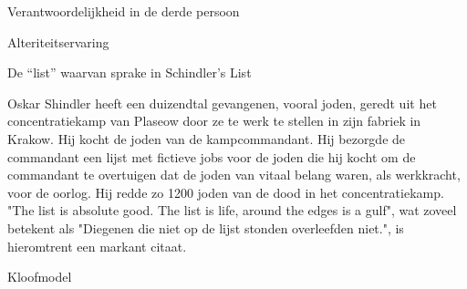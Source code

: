 \documentclass[main.tex]{subfiles}
\begin{document}
\begin{examenvraag}
    \begin{vraag}
        Verantwoordelijkheid in de derde persoon
    \end{vraag}

    \begin{antwoord}

    \end{antwoord}
\end{examenvraag}


\begin{examenvraag}
    \begin{vraag}
        Alteriteitservaring
    \end{vraag}

    \begin{antwoord}

    \end{antwoord}
\end{examenvraag}


\begin{examenvraag}
    \begin{vraag}
        De “list” waarvan sprake in Schindler’s List
    \end{vraag}

    \begin{antwoord}
        Oskar Shindler heeft een duizendtal gevangenen, vooral joden, geredt uit het concentratiekamp van Plaseow door ze te werk te stellen in zijn fabriek in Krakow.
        Hij kocht de joden van de kampcommandant.
        Hij bezorgde de commandant een lijst met fictieve jobs voor de joden die hij kocht om de commandant te overtuigen dat de joden van vitaal belang waren, als werkkracht, voor de oorlog.
        Hij redde zo 1200 joden van de dood in het concentratiekamp.
        "The list is absolute good. The list is life, around the edges is a gulf", wat zoveel betekent als "Diegenen die niet op de lijst stonden overleefden niet.", is hieromtrent een markant citaat.
    \end{antwoord}
\end{examenvraag}


\begin{examenvraag}
    \begin{vraag}
        Kloofmodel
    \end{vraag}

    \begin{antwoord}

    \end{antwoord}
\end{examenvraag}
\end{document}
